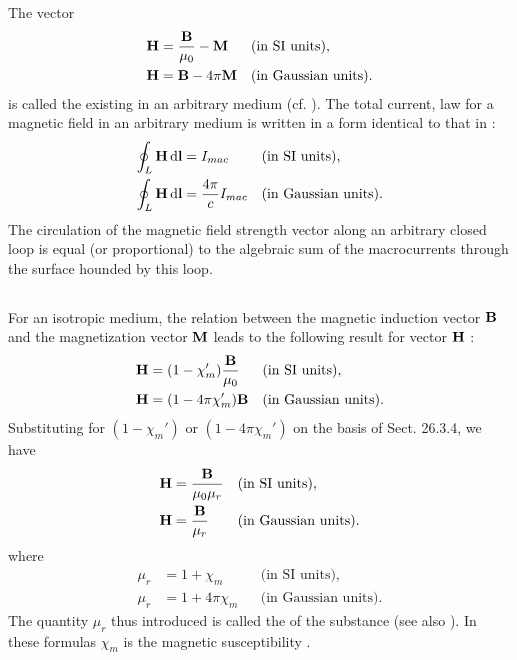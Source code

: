 The vector
\begin{align*}%
\vb{H} & = \frac{\vb{B}}{\mu_{0}} - \vb{M} && \text{(in SI units),} \\
\vb{H} & = \vb{B} - 4 \pi \vb{M} && \text{(in Gaussian units)}.
\end{align*}
is called the  existing in an arbitrary medium (cf. ). The total current, law for a magnetic field in an arbitrary medium is written in a form identical to that in :
\begin{align*}%
\oint_{L} \vb{H} \, \dd \vb{l} & =  I_{mac} && \text{(in SI units),} \\
\oint_{L} \vb{H} \, \dd \vb{l} & =  \frac{4\pi}{c} I_{mac} && \text{(in Gaussian units)}.
\end{align*}
The circulation of the magnetic field strength vector along an arbitrary closed loop is equal (or proportional) to the algebraic sum of the macrocurrents through the surface hounded by this loop.

\subsection{}\label{26.4.5} For an isotropic medium, the relation between the magnetic induction vector $\vb{B}$ and the magnetization vector $\vb{M}$  leads to the following result for vector $\vb{H}$ :
\begin{align*}%
\vb{H} & =  (1 - \chi_{m}') \frac{\vb{B}}{\mu_{0}} && \text{(in SI units),} \\
\vb{H} & =  (1 - 4 \pi \chi_{m}') \vb{B} && \text{(in Gaussian units)}.
\end{align*}
Substituting for $(1 - \chi_{m}')$ or $(1 - 4\pi \chi_{m}')$ on the basis of Sect. 26.3.4, we have
\begin{align*}%
\vb{H} & =   \frac{\vb{B}}{\mu_{0}\mu_{r}} && \text{(in SI units),} \\
\vb{H} & =  \frac{\vb{B}}{\mu_{r}} && \text{(in Gaussian units)}.
\end{align*}
where
\begin{align*}%
\mu_{r} & =  1 + \chi_{m} && \text{(in SI units),} \\
\mu_{r} & =  1 + 4\pi \chi_{m}  && \text{(in Gaussian units)}.
\end{align*}
The quantity $\mu_{r}$ thus introduced is called the  of the substance (see also ). In these formulas $\chi_{m}$ is the magnetic susceptibility .


